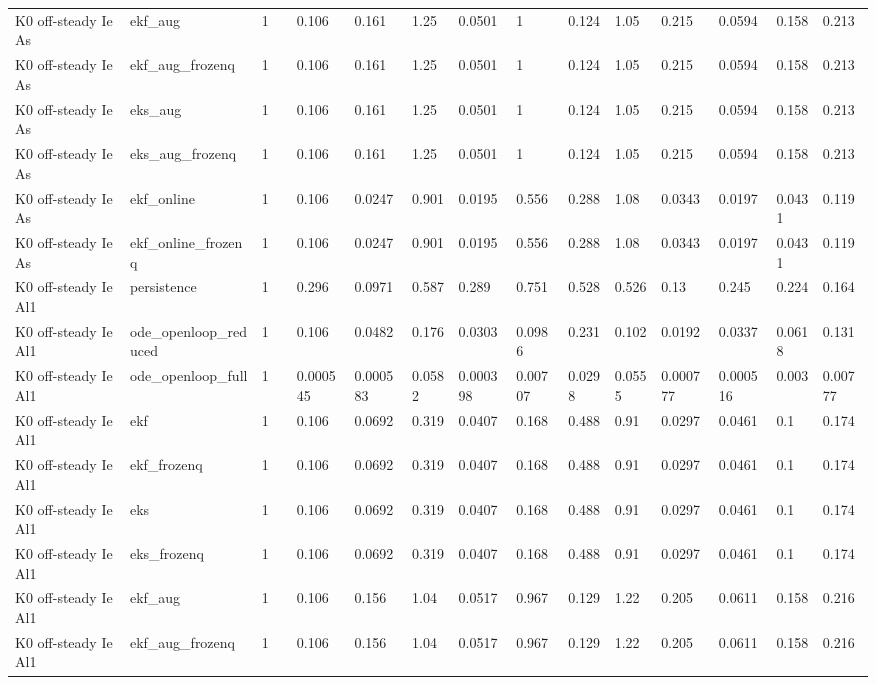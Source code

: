 \begin{table}[t]
\begin{tabular}{lllllllllllllll}
K0 off-steady Ie As & ekf\_aug & 1 &  & 0.106 & 0.161 & 1.25 & 0.0501 & 1 & 0.124 & 1.05 & 0.215 & 0.0594 & 0.158 & 0.213 \\
K0 off-steady Ie As & ekf\_aug\_frozenq & 1 &  & 0.106 & 0.161 & 1.25 & 0.0501 & 1 & 0.124 & 1.05 & 0.215 & 0.0594 & 0.158 & 0.213 \\
K0 off-steady Ie As & eks\_aug & 1 &  & 0.106 & 0.161 & 1.25 & 0.0501 & 1 & 0.124 & 1.05 & 0.215 & 0.0594 & 0.158 & 0.213 \\
K0 off-steady Ie As & eks\_aug\_frozenq & 1 &  & 0.106 & 0.161 & 1.25 & 0.0501 & 1 & 0.124 & 1.05 & 0.215 & 0.0594 & 0.158 & 0.213 \\
K0 off-steady Ie As & ekf\_online & 1 &  & 0.106 & 0.0247 & 0.901 & 0.0195 & 0.556 & 0.288 & 1.08 & 0.0343 & 0.0197 & 0.0431 & 0.119 \\
K0 off-steady Ie As & ekf\_online\_frozenq & 1 &  & 0.106 & 0.0247 & 0.901 & 0.0195 & 0.556 & 0.288 & 1.08 & 0.0343 & 0.0197 & 0.0431 & 0.119 \\
K0 off-steady Ie Al1 & persistence & 1 &  & 0.296 & 0.0971 & 0.587 & 0.289 & 0.751 & 0.528 & 0.526 & 0.13 & 0.245 & 0.224 & 0.164 \\
K0 off-steady Ie Al1 & ode\_openloop\_reduced & 1 &  & 0.106 & 0.0482 & 0.176 & 0.0303 & 0.0986 & 0.231 & 0.102 & 0.0192 & 0.0337 & 0.0618 & 0.131 \\
K0 off-steady Ie Al1 & ode\_openloop\_full & 1 &  & 0.000545 & 0.000583 & 0.0582 & 0.000398 & 0.00707 & 0.0298 & 0.0555 & 0.000777 & 0.000516 & 0.003 & 0.00777 \\
K0 off-steady Ie Al1 & ekf & 1 &  & 0.106 & 0.0692 & 0.319 & 0.0407 & 0.168 & 0.488 & 0.91 & 0.0297 & 0.0461 & 0.1 & 0.174 \\
K0 off-steady Ie Al1 & ekf\_frozenq & 1 &  & 0.106 & 0.0692 & 0.319 & 0.0407 & 0.168 & 0.488 & 0.91 & 0.0297 & 0.0461 & 0.1 & 0.174 \\
K0 off-steady Ie Al1 & eks & 1 &  & 0.106 & 0.0692 & 0.319 & 0.0407 & 0.168 & 0.488 & 0.91 & 0.0297 & 0.0461 & 0.1 & 0.174 \\
K0 off-steady Ie Al1 & eks\_frozenq & 1 &  & 0.106 & 0.0692 & 0.319 & 0.0407 & 0.168 & 0.488 & 0.91 & 0.0297 & 0.0461 & 0.1 & 0.174 \\
K0 off-steady Ie Al1 & ekf\_aug & 1 &  & 0.106 & 0.156 & 1.04 & 0.0517 & 0.967 & 0.129 & 1.22 & 0.205 & 0.0611 & 0.158 & 0.216 \\
K0 off-steady Ie Al1 & ekf\_aug\_frozenq & 1 &  & 0.106 & 0.156 & 1.04 & 0.0517 & 0.967 & 0.129 & 1.22 & 0.205 & 0.0611 & 0.158 & 0.216 \\

\end{tabular}
\end{table}
